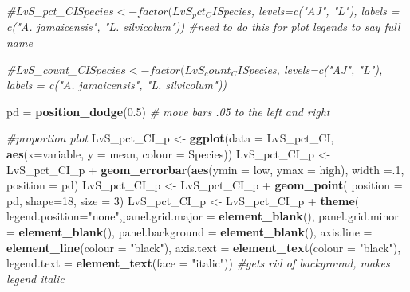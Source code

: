 \documentclass[]{article}
\newenvironment{Shaded}{\begin{snugshade}}{\end{snugshade}}
\newcommand{\KeywordTok}[1]{\textcolor[rgb]{0.13,0.29,0.53}{\textbf{{#1}}}}
\newcommand{\DataTypeTok}[1]{\textcolor[rgb]{0.13,0.29,0.53}{{#1}}}
\newcommand{\DecValTok}[1]{\textcolor[rgb]{0.00,0.00,0.81}{{#1}}}
\newcommand{\FloatTok}[1]{\textcolor[rgb]{0.00,0.00,0.81}{{#1}}}
\newcommand{\StringTok}[1]{\textcolor[rgb]{0.31,0.60,0.02}{{#1}}}
\newcommand{\CommentTok}[1]{\textcolor[rgb]{0.56,0.35,0.01}{\textit{{#1}}}}
\newcommand{\NormalTok}[1]{{#1}}
\begin{document}
\begin{Shaded}
\begin{Highlighting}[]
\CommentTok{#LvS_pct_CI$Species <- factor(LvS_pct_CI$Species, levels=c("AJ", "L"), labels = c("A. jamaicensis", "L. silvicolum")) #need to do this for plot legends to say full name}

\CommentTok{#LvS_count_CI$Species <- factor(LvS_count_CI$Species, levels=c("AJ", "L"), labels = c("A. jamaicensis", "L. silvicolum"))}


\NormalTok{pd =}\StringTok{ }\KeywordTok{position_dodge}\NormalTok{(}\FloatTok{0.5}\NormalTok{) }\CommentTok{# move bars .05 to the left and right}

\CommentTok{#proportion plot}
\NormalTok{LvS_pct_CI_p <-}\StringTok{ }\KeywordTok{ggplot}\NormalTok{(}\DataTypeTok{data =} \NormalTok{LvS_pct_CI, }\KeywordTok{aes}\NormalTok{(}\DataTypeTok{x=}\NormalTok{variable, }\DataTypeTok{y =} \NormalTok{mean, }\DataTypeTok{colour =} \NormalTok{Species))}
\NormalTok{LvS_pct_CI_p <-}\StringTok{ }\NormalTok{LvS_pct_CI_p +}\StringTok{ }\KeywordTok{geom_errorbar}\NormalTok{(}\KeywordTok{aes}\NormalTok{(}\DataTypeTok{ymin =} \NormalTok{low, }\DataTypeTok{ymax =} \NormalTok{high), }\DataTypeTok{width =}\NormalTok{.}\DecValTok{1}\NormalTok{, }\DataTypeTok{position =} \NormalTok{pd)}
\NormalTok{LvS_pct_CI_p <-}\StringTok{ }\NormalTok{LvS_pct_CI_p +}\StringTok{ }\KeywordTok{geom_point}\NormalTok{( }\DataTypeTok{position =} \NormalTok{pd, }\DataTypeTok{shape=}\DecValTok{18}\NormalTok{, }\DataTypeTok{size =} \DecValTok{3}\NormalTok{)}
\NormalTok{LvS_pct_CI_p <-}\StringTok{ }\NormalTok{LvS_pct_CI_p +}\StringTok{  }\KeywordTok{theme}\NormalTok{( }\DataTypeTok{legend.position=}\StringTok{"none"}\NormalTok{,}\DataTypeTok{panel.grid.major =} \KeywordTok{element_blank}\NormalTok{(), }\DataTypeTok{panel.grid.minor =} \KeywordTok{element_blank}\NormalTok{(),}
\DataTypeTok{panel.background =} \KeywordTok{element_blank}\NormalTok{(), }\DataTypeTok{axis.line =} \KeywordTok{element_line}\NormalTok{(}\DataTypeTok{colour =} \StringTok{"black"}\NormalTok{), }\DataTypeTok{axis.text =} \KeywordTok{element_text}\NormalTok{(}\DataTypeTok{colour =} \StringTok{"black"}\NormalTok{), }\DataTypeTok{legend.text =} \KeywordTok{element_text}\NormalTok{(}\DataTypeTok{face =} \StringTok{"italic"}\NormalTok{))  }\CommentTok{#gets rid of background, makes legend italic}


\end{Highlighting}
\end{Shaded}
\end{document}
